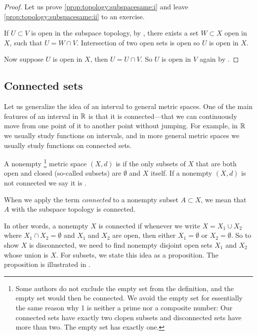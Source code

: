 \begin{proof}
Let us prove
\ref{prop:topology:subspacesame:i}
and leave 
\ref{prop:topology:subspacesame:ii} to an exercise.

If $U \subset V$ is open in the subspace topology, by
, there exists a set $W \subset X$
open in $X$, such that $U = W \cap V$.  Intersection of two open sets
is open so $U$ is open in $X$.

Now suppose $U$ is open in $X$, then $U = U \cap V$. So
$U$ is open in $V$ again by .
\end{proof}

\subsection{Connected sets}

Let us generalize the idea of an interval to general metric spaces.  One of
the main features of an interval in ${\mathbb{R}}$ is that it is
connected---that we can continuously move from one point of it to
another point without jumping.
For example, in ${\mathbb{R}}$ we usually study functions on intervals,
and in more general metric spaces we usually study functions on connected sets.

\begin{defn}
A nonempty%
\footnote{Some authors do not exclude the empty set from the definition,
and the empty set would then be connected.
We avoid the empty set for essentially the same reason why
1 is neither a prime nor a composite number:  Our connected sets have exactly
two clopen subsets and disconnected sets have more than two.  The empty set
has exactly one.}
metric space $(X,d)$ is \emph{} if the
only subsets of $X$ that are both open and closed (so-called
\emph{} subsets) are $\emptyset$ and $X$ itself.
If a nonempty $(X,d)$ is not connected we say it is
\emph{}.

When we apply the term \emph{connected} to a nonempty subset $A \subset X$, we 
mean that $A$ with the subspace topology is connected.
\end{defn}

In other words, a nonempty $X$ is connected if whenever we write
$X = X_1 \cup X_2$ where $X_1 \cap X_2 = \emptyset$ and $X_1$ and $X_2$ are
open, then either $X_1 = \emptyset$ or $X_2 = \emptyset$.
So to show $X$ is disconnected, we need to find nonempty
disjoint open sets $X_1$ and
$X_2$ whose union is $X$.
For subsets, we state this idea as a proposition.
The proposition is illustrated in .

